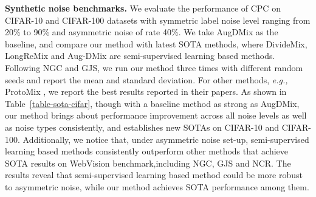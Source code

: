 \documentclass{article} \usepackage{iclr2023_conference,times}
\begin{document}
\textbf{Synthetic noise benchmarks.} We evaluate the performance of CPC on CIFAR-10 and CIFAR-100 datasets with symmetric label noise level ranging from 20\% to 90\% and asymmetric noise of rate 40\%. We take AugDMix as the baseline, and compare our method with latest SOTA methods, where DivideMix, LongReMix and Aug-DMix are semi-supervised learning based methods. Following NGC and GJS, we run our method three times with different random seeds and report the mean and standard deviation. For other methods, \emph{e.g.,} ProtoMix \citep{li2021learning}, we report the best results reported in their papers. As shown in Table~\ref{table-sota-cifar}, though with a baseline method as strong as AugDMix, our method brings about performance improvement across all noise levels as well as noise types consistently, and establishes new SOTAs on CIFAR-10 and CIFAR-100. Additionally, we notice that, under asymmetric noise set-up, semi-supervised learning based methods consistently outperform other methods that achieve SOTA results on WebVision benchmark,including NGC, GJS and NCR. The results reveal that semi-supervised learning based method could be more robust to asymmetric noise, while our method achieves SOTA performance among them.
\end{document}
